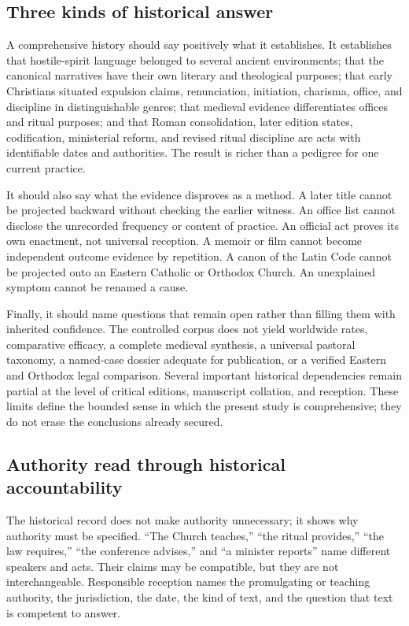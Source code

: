 \subsection{Three kinds of historical answer}

A comprehensive history should say positively what it establishes. It
establishes that hostile-spirit language belonged to several ancient
environments; that the canonical narratives have their own literary and
theological purposes; that early Christians situated expulsion claims,
renunciation, initiation, charisma, office, and discipline in distinguishable
genres; that medieval evidence differentiates offices and ritual purposes;
and that Roman consolidation, later edition states, codification, ministerial
reform, and revised ritual discipline are acts with identifiable dates and
authorities. The result is richer than a pedigree for one current practice.

It should also say what the evidence disproves as a method. A later title
cannot be projected backward without checking the earlier witness. An office
list cannot disclose the unrecorded frequency or content of practice. An
official act proves its own enactment, not universal reception. A memoir or
film cannot become independent outcome evidence by repetition. A canon of the
Latin Code cannot be projected onto an Eastern Catholic or Orthodox Church. An
unexplained symptom cannot be renamed a cause.

Finally, it should name questions that remain open rather than filling them
with inherited confidence. The controlled corpus does not yield worldwide
rates, comparative efficacy, a complete medieval synthesis, a universal
pastoral taxonomy, a named-case dossier adequate for publication, or a
verified Eastern and Orthodox legal comparison. Several important historical
dependencies remain partial at the level of critical editions, manuscript
collation, and reception. These limits define the bounded sense in which the
present study is comprehensive; they do not erase the conclusions already
secured.

\subsection{Authority read through historical accountability}

The historical record does not make authority unnecessary; it shows why
authority must be specified. ``The Church teaches,'' ``the ritual provides,''
``the law requires,'' ``the conference advises,'' and ``a minister reports''
name different speakers and acts. Their claims may be compatible, but they are
not interchangeable. Responsible reception names the promulgating or teaching
authority, the jurisdiction, the date, the kind of text, and the question that
text is competent to answer.

